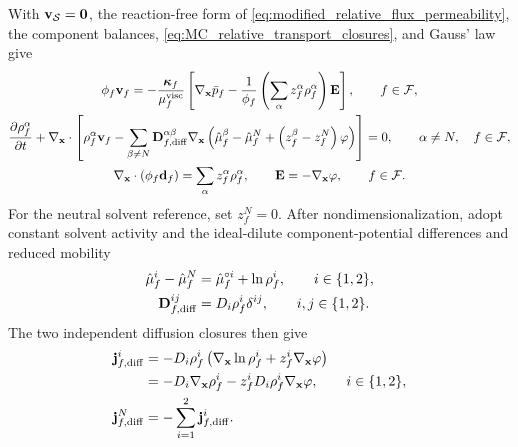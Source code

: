 With \(\mathbf{v}_{\mathcal{S}}=\mathbf{0}\), the reaction-free form of
\eqref{eq:modified_relative_flux_permeability}, the component balances,
\eqref{eq:MC_relative_transport_closures}, and Gauss' law give
%
\begin{subequations}
	\label{eq:nernst_planck_darcy_limit}
	\begin{gather}
		\phi_f\mathbf{v}_f
		=
		-\frac{\boldsymbol{\kappa}_f}{\mu_f^{\mathrm{visc}}}
		\left[
			\nabla_{\mathbf{x}}\bar p_f
			-
			\frac{1}{\phi_f}
			\left(
				\sum_\alpha z_f^\alpha\rho_f^\alpha
			\right)\mathbf{E}
		\right],
		\qquad
		f\in\mathcal{F},
		\label{eq:nernst_planck_darcy_velocity}
		\\
		\frac{\partial\rho_f^\alpha}{\partial t}
		+
		\nabla_{\mathbf{x}}\cdot
		\left[
			\rho_f^\alpha\mathbf{v}_f
			-
			\sum_{\beta\ne N}
			\mathbf{D}_{f,{\rm diff}}^{\alpha\beta}
			\nabla_{\mathbf{x}}
			\left(
				\hat\mu_f^\beta-\hat\mu_f^N
				+
				\left(
				z_f^\beta-z_f^N
				\right)\varphi
			\right)
		\right]
		=0,
		\qquad
		\alpha\ne N,\quad f\in\mathcal{F},
		\label{eq:nernst_planck_darcy_component_balance}
		\\
		\nabla_{\mathbf{x}}\cdot
		\left(
			\phi_f\mathbf{d}_f
		\right)
		=
		\sum_\alpha z_f^\alpha\rho_f^\alpha,
		\qquad
		\mathbf{E}=-\nabla_{\mathbf{x}}\varphi,
		\qquad
		f\in\mathcal{F} .
		\label{eq:nernst_planck_darcy_gauss_law}
	\end{gather}
\end{subequations}
%
For the neutral solvent reference, set \(z_f^N=0\).  After
nondimensionalization, adopt constant solvent activity and the ideal-dilute
component-potential differences and reduced mobility
%
\begin{align}
	\hat\mu_f^i-\hat\mu_f^N
	&=
	\hat\mu_f^{\circ i}+\ln\rho_f^i,
	\qquad
	i\in\{1,2\},
	\notag\\
	\mathbf{D}_{f,{\rm diff}}^{ij}
	&=
	D_i\rho_f^i\delta^{ij},
	\qquad
	i,j\in\{1,2\}.
	\label{eq:nernst_planck_darcy_solvent_reference_closure}
\end{align}
%
The two independent diffusion closures then give
%
\begin{align}
	\mathbf{j}_{f,{\rm diff}}^i
	&=
	-D_i\rho_f^i
	\left(
	\nabla_{\mathbf{x}}\ln\rho_f^i
	+
	z_f^i\nabla_{\mathbf{x}}\varphi
	\right)
	\notag\\
	&=
	-D_i\nabla_{\mathbf{x}}\rho_f^i
	-
	z_f^iD_i\rho_f^i\nabla_{\mathbf{x}}\varphi,
	\qquad
	i\in\{1,2\},
	\label{eq:nernst_planck_darcy_ionic_flux_specialization}\\
	\mathbf{j}_{f,{\rm diff}}^N
	&=
	-\sum_{i=1}^2\mathbf{j}_{f,{\rm diff}}^i.
	\label{eq:nernst_planck_darcy_solvent_flux_reconstruction}
\end{align}

